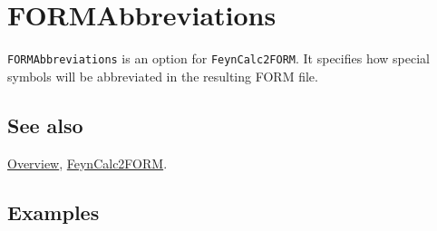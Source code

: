 \documentclass[../FeynCalcManual.tex]{subfiles}
\begin{document}
\hypertarget{formabbreviations}{%
\section{FORMAbbreviations}\label{formabbreviations}}

\texttt{FORMAbbreviations} is an option for \texttt{FeynCalc2FORM}. It
specifies how special symbols will be abbreviated in the resulting FORM
file.

\subsection{See also}

\hyperlink{toc}{Overview}, \hyperlink{feyncalc2form}{FeynCalc2FORM}.

\subsection{Examples}
\end{document}
